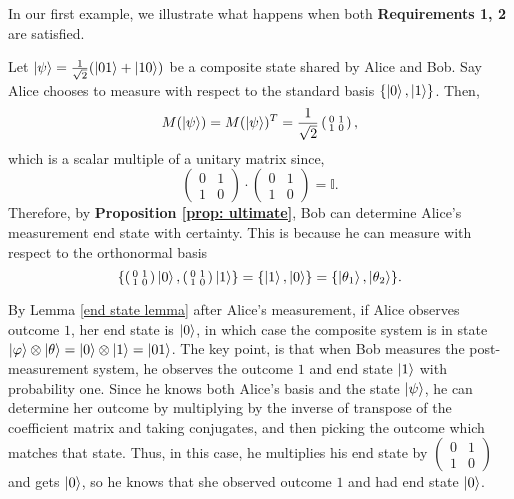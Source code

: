 In our first example, we illustrate what happens when both {\bf{Requirements 1, 2}} are satisfied.
\begin{example}
\label{example good}
Let $\ket{\psi}=\frac{1}{\sqrt{2}}(\ket{01}+\ket{10})$ be a composite state shared by Alice and Bob.  Say Alice chooses to measure with respect to the standard basis $\{\ket{0}, \ket{1}\}$.  Then,
\begin{equation*}
M(\ket{\psi})=M(\ket{\psi})^T= \frac{1}{\sqrt{2}}\left(\begin{smallmatrix}0 & 1\\1 & 0\end{smallmatrix}\right),
\end{equation*}
which is a scalar multiple of a unitary matrix since,
\begin{equation*}
\left(\begin{smallmatrix}0 & 1\\1 & 0\end{smallmatrix}\right)\cdot \left(\begin{smallmatrix}0 & 1\\1 & 0\end{smallmatrix}\right)=\mathbb{I}.
\end{equation*}
Therefore, by \textbf{Proposition \ref{prop: ultimate}}, Bob can determine Alice's measurement end state with certainty. This is because he can measure with respect to the orthonormal basis
\begin{equation*}
\{\left(\begin{smallmatrix}0 & 1\\1 & 0\end{smallmatrix}\right)\ket{0}, \left(\begin{smallmatrix}0 & 1\\1 & 0\end{smallmatrix}\right)\ket{1}\}=\{\ket{1}, \ket{0}\}=\{\ket{\theta_1},\ket{\theta_2}\}.
\end{equation*}

By Lemma \ref{end state lemma} after Alice's measurement, if Alice observes outcome $1$, her end state is $\ket{0}$, in which case the composite system is in state $\ket{\varphi}\otimes \ket{\theta}=\ket{0}\otimes\ket{1}=\ket{01}$.  The key point, is that when Bob measures the post-measurement system, he observes the outcome $1$ and end state $\ket{1}$ with probability one.  Since he knows both Alice's basis and the state $\ket{\psi}$, he can determine her outcome by multiplying by the inverse of transpose of the coefficient matrix and taking conjugates, and then picking the outcome which matches that state.  Thus, in this case, he multiplies his end state by $\left(\begin{smallmatrix}0&1\\1&0\end{smallmatrix}\right)$ and gets $\ket{0}$, so he knows that she observed outcome $1$  and had end state $\ket{0}$.


\end{example}
